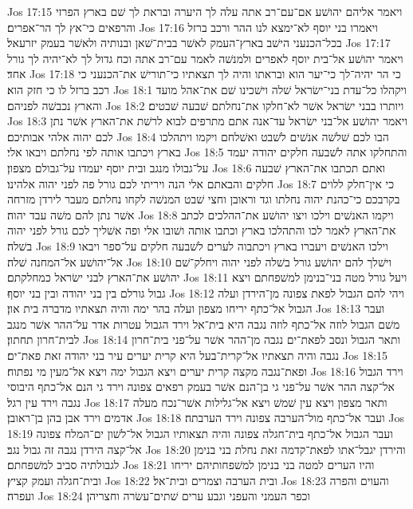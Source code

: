Jos 17:15  ויאמר אליהם יהושׁע אם־עם־רב אתה עלה לך היערה ובראת לך שׁם בארץ הפרזי והרפאים כי־אץ לך הר־אפרים׃
Jos 17:16  ויאמרו בני יוסף לא־ימצא לנו ההר ורכב ברזל בכל־הכנעני הישׁב בארץ־העמק לאשׁר בבית־שׁאן ובנותיה ולאשׁר בעמק יזרעאל׃
Jos 17:17  ויאמר יהושׁע אל־בית יוסף לאפרים ולמנשׁה לאמר עם־רב אתה וכח גדול לך לא־יהיה לך גורל אחד׃
Jos 17:18  כי הר יהיה־לך כי־יער הוא ובראתו והיה לך תצאתיו כי־תורישׁ את־הכנעני כי רכב ברזל לו כי חזק הוא׃
Jos 18:1  ויקהלו כל־עדת בני־ישׂראל שׁלה וישׁכינו שׁם את־אהל מועד והארץ נכבשׁה לפניהם׃
Jos 18:2  ויותרו בבני ישׂראל אשׁר לא־חלקו את־נחלתם שׁבעה שׁבטים׃
Jos 18:3  ויאמר יהושׁע אל־בני ישׂראל עד־אנה אתם מתרפים לבוא לרשׁת את־הארץ אשׁר נתן לכם יהוה אלהי אבותיכם׃
Jos 18:4  הבו לכם שׁלשׁה אנשׁים לשׁבט ואשׁלחם ויקמו ויתהלכו בארץ ויכתבו אותה לפי נחלתם ויבאו אלי׃
Jos 18:5  והתחלקו אתה לשׁבעה חלקים יהודה יעמד על־גבולו מנגב ובית יוסף יעמדו על־גבולם מצפון׃
Jos 18:6  ואתם תכתבו את־הארץ שׁבעה חלקים והבאתם אלי הנה ויריתי לכם גורל פה לפני יהוה אלהינו׃
Jos 18:7  כי אין־חלק ללוים בקרבכם כי־כהנת יהוה נחלתו וגד וראובן וחצי שׁבט המנשׁה לקחו נחלתם מעבר לירדן מזרחה אשׁר נתן להם משׁה עבד יהוה׃
Jos 18:8  ויקמו האנשׁים וילכו ויצו יהושׁע את־ההלכים לכתב את־הארץ לאמר לכו והתהלכו בארץ וכתבו אותה ושׁובו אלי ופה אשׁליך לכם גורל לפני יהוה בשׁלה׃
Jos 18:9  וילכו האנשׁים ויעברו בארץ ויכתבוה לערים לשׁבעה חלקים על־ספר ויבאו אל־יהושׁע אל־המחנה שׁלה׃
Jos 18:10  וישׁלך להם יהושׁע גורל בשׁלה לפני יהוה ויחלק־שׁם יהושׁע את־הארץ לבני ישׂראל כמחלקתם׃
Jos 18:11  ויעל גורל מטה בני־בנימן למשׁפחתם ויצא גבול גורלם בין בני יהודה ובין בני יוסף׃
Jos 18:12  ויהי להם הגבול לפאת צפונה מן־הירדן ועלה הגבול אל־כתף יריחו מצפון ועלה בהר ימה והיה תצאתיו מדברה בית און׃
Jos 18:13  ועבר משׁם הגבול לוזה אל־כתף לוזה נגבה היא בית־אל וירד הגבול עטרות אדר על־ההר אשׁר מנגב לבית־חרון תחתון׃
Jos 18:14  ותאר הגבול ונסב לפאת־ים נגבה מן־ההר אשׁר על־פני בית־חרון נגבה והיה תצאתיו אל־קרית־בעל היא קרית יערים עיר בני יהודה זאת פאת־ים׃
Jos 18:15  ופאת־נגבה מקצה קרית יערים ויצא הגבול ימה ויצא אל־מעין מי נפתוח׃
Jos 18:16  וירד הגבול אל־קצה ההר אשׁר על־פני גי בן־הנם אשׁר בעמק רפאים צפונה וירד גי הנם אל־כתף היבוסי נגבה וירד עין רגל׃
Jos 18:17  ותאר מצפון ויצא עין שׁמשׁ ויצא אל־גלילות אשׁר־נכח מעלה אדמים וירד אבן בהן בן־ראובן׃
Jos 18:18  ועבר אל־כתף מול־הערבה צפונה וירד הערבתה׃
Jos 18:19  ועבר הגבול אל־כתף בית־חגלה צפונה והיה תצאותיו הגבול אל־לשׁון ים־המלח צפונה אל־קצה הירדן נגבה זה גבול נגב׃
Jos 18:20  והירדן יגבל־אתו לפאת־קדמה זאת נחלת בני בנימן לגבולתיה סביב למשׁפחתם׃
Jos 18:21  והיו הערים למטה בני בנימן למשׁפחותיהם יריחו ובית־חגלה ועמק קציץ׃
Jos 18:22  ובית הערבה וצמרים ובית־אל׃
Jos 18:23  והעוים והפרה ועפרה׃
Jos 18:24  וכפר העמני והעפני וגבע ערים שׁתים־עשׂרה וחצריהן׃

